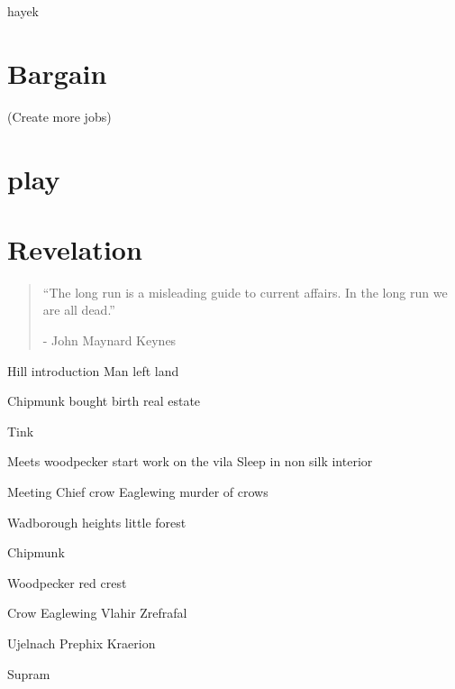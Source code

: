 \documentclass[smalldemyvopaper,11pt,twoside,onecolumn,openright,extrafontsizes]{memoir}
\begin{document}
hayek

\chapter{Bargain}


(Create more jobs)

\chapter{play}


\chapter{Revelation}

\vspace{-1.3cm}
\begin{localsize}{10}
	\begin{quote}
		“The long run is a misleading guide to current affairs. In the long run we are all dead.” 
		\begin{flushright}- John Maynard Keynes \end{flushright}
	\end{quote} 
\end{localsize}
\vspace{1cm}


 Hill introduction Man left land

 Chipmunk bought birth real estate
 
 Tink

 Meets woodpecker start work on the vila
 Sleep in non silk interior

Meeting Chief crow Eaglewing murder of crows

Wadborough heights little forest 

Chipmunk 

Woodpecker 
red crest

Crow Eaglewing
Vlahir
Zrefrafal

Ujelnach
Prephix
Kraerion

Supram

\end{document}
